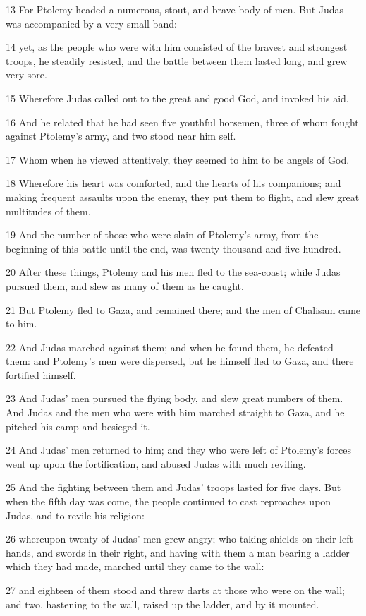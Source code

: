 13 For Ptolemy headed a numerous, stout, and brave body of men. But Judas was accompanied by a very small band: 

14 yet, as the people who were with him consisted of the bravest and strongest troops, he steadily resisted, and the battle between them lasted long, and grew very sore. 

15 Wherefore Judas called out to the great and good God, and invoked his aid. 

16 And he related that he had seen five youthful horsemen, three of whom fought against Ptolemy’s army, and two stood near him self. 

17 Whom when he viewed attentively, they seemed to him to be angels of God. 

18 Wherefore his heart was comforted, and the hearts of his companions; and making frequent assaults upon the enemy, they put them to flight, and slew great multitudes of them. 

19 And the number of those who were slain of Ptolemy’s army, from the beginning of this battle until the end, was twenty thousand and five hundred. 

20 After these things, Ptolemy and his men fled to the sea-coast; while Judas pursued them, and slew as many of them as he caught. 

21 But Ptolemy fled to Gaza, and remained there; and the men of Chalisam came to him. 

22 And Judas marched against them; and when he found them, he defeated them: and Ptolemy’s men were dispersed, but he himself fled to Gaza, and there fortified himself. 

23 And Judas’ men pursued the flying body, and slew great numbers of them. And Judas and the men who were with him marched straight to Gaza, and he pitched his camp and besieged it. 

24 And Judas’ men returned to him; and they who were left of Ptolemy’s forces went up upon the fortification, and abused Judas with much reviling. 

25 And the fighting between them and Judas’ troops lasted for five days. But when the fifth day was come, the people continued to cast reproaches upon Judas, and to revile his religion: 

26 whereupon twenty of Judas’ men grew angry; who taking shields on their left hands, and swords in their right, and having with them a man bearing a ladder which they had made, marched until they came to the wall: 

27 and eighteen of them stood and threw darts at those who were on the wall; and two, hastening to the wall, raised up the ladder, and by it mounted. 

